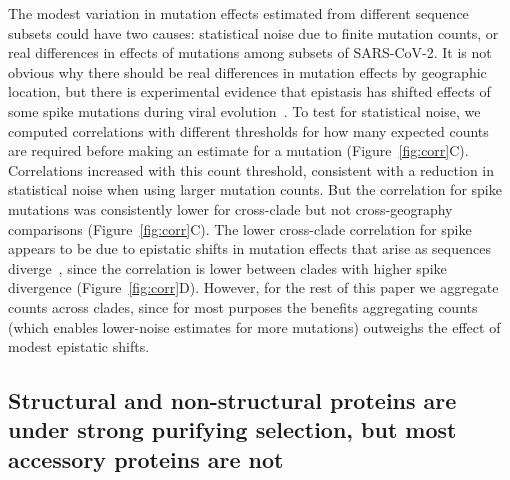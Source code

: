\documentclass[9pt,twocolumn,twoside]{gsajnl_modified}
\begin{document}
The modest variation in mutation effects estimated from different sequence subsets could have two causes: statistical noise due to finite mutation counts, or real differences in effects of mutations among subsets of SARS-CoV-2.
It is not obvious why there should be real differences in mutation effects by geographic location, but there is experimental evidence that epistasis has shifted effects of some spike mutations during viral evolution~\citep{starr2022shifting,moulana2022compensatory,mccallum2021n}.
To test for statistical noise, we computed correlations with different thresholds for how many expected counts are required before making an estimate for a mutation (Figure~\ref{fig:corr}C).
Correlations increased with this count threshold, consistent with a reduction in statistical noise when using larger mutation counts.
But the correlation for spike mutations was consistently lower for cross-clade but not cross-geography comparisons (Figure~\ref{fig:corr}C).
The lower cross-clade correlation for spike appears to be due to epistatic shifts in mutation effects that arise as sequences diverge~\citep{starr2022shifting, pollock2012amino, shah2015contingency}, since the correlation is lower between clades with higher spike divergence (Figure~\ref{fig:corr}D).
However, for the rest of this paper we aggregate counts across clades, since for most purposes the benefits aggregating counts (which enables lower-noise estimates for more mutations) outweighs the effect of modest epistatic shifts.

\subsection*{Structural and non-structural proteins are under strong purifying selection, but most accessory proteins are not}
\end{document}
